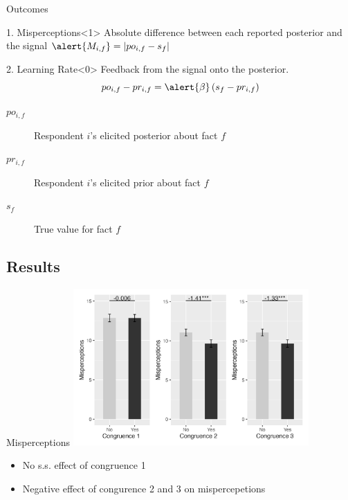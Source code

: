\documentclass[10pt]{beamer}
\begin{document}
\begin{frame}{Outcomes}
\begin{block}{1. Misperceptions}<1>
Absolute difference between each reported posterior and the signal 
$\alert{M_{i,f}} = |po_{i,f} - s_f|$
\end{block}

\begin{block}{2. Learning Rate}<0>
Feedback from the signal onto the posterior.
\begin{equation*}
    po_{i,f} - pr_{i,f} = \alert{\beta} \left( s_f - pr_{i,f}\right)
    \label{eq: learningrate}
  \end{equation*}
\end{block}


\begin{description}
  \item[$po_{i,f}$] Respondent $i$'s elicited posterior about fact $f$
  \item[$pr_{i,f}$] Respondent $i$'s elicited prior about fact $f$
  \item[$s_f$] True value for fact $f$
\end{description}
\end{frame}




\subsection{Results}



\begin{frame}{Misperceptions}
\label{mainI}
\centering
\includegraphics[height=6cm]{output/MainI.png}	
\begin{itemize}
\item No s.s. effect of congruence 1
\item Negative effect of congurence 2 and 3 on mispercepetions
\end{itemize}
\hfill \hyperlink{mainI_reg}{}
\end{frame}
\end{document}

